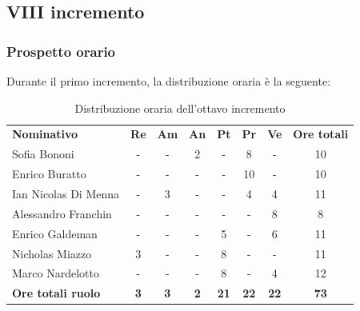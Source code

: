 \documentclass[../piano-di-progetto.tex]{subfiles}
\begin{document}
  \subsection{VIII incremento}

  \subsubsection{Prospetto orario}
 Durante il primo incremento, la distribuzione oraria è la seguente:
  \begin{table}[H]
    \centering
    \begin{tabular}{lccccccc}
    \rowcolor{lightgray}
    \textbf{Nominativo}       & \textbf{Re} & \textbf{Am} & \textbf{An} & \textbf{Pt} & \textbf{Pr} & \textbf{Ve} & \textbf{Ore totali} \\
Sofia Bononi              & -           & -           & 2           & -           & 8           & -           & 10                  \\
Enrico Buratto            & -           & -           & -           & -           & 10          & -           & 10                  \\
Ian Nicolas Di Menna      & -           & 3           & -           & -           & 4           & 4           & 11                  \\
Alessandro Franchin       & -           & -           & -           & -           & -           & 8           & 8                   \\
Enrico Galdeman           & -           & -           & -           & 5           & -           & 6           & 11                  \\
Nicholas Miazzo           & 3           & -           & -           & 8           & -           & -           & 11                  \\
Marco Nardelotto          & -           & -           & -           & 8           & -           & 4           & 12                  \\
\textbf{Ore totali ruolo} & \textbf{3}  & \textbf{3}  & \textbf{2}  & \textbf{21} & \textbf{22} & \textbf{22} & \textbf{73}        
    
    \end{tabular}
    \caption{Distribuzione oraria dell'ottavo incremento}
  \end{table}
\end{document}
